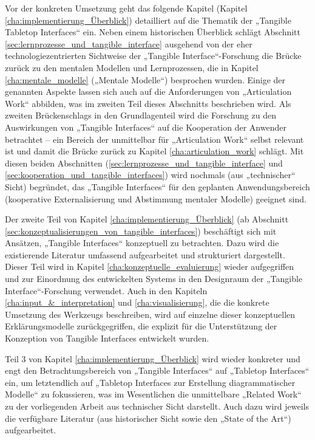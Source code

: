 Vor der konkreten Umsetzung geht das folgende Kapitel (Kapitel \ref{cha:implementierung_Überblick}) detailliert auf die Thematik der „Tangible Tabletop Interfaces“ ein. Neben einem historischen Überblick schlägt Abschnitt \ref{sec:lernprozesse_und_tangible_interface} ausgehend von der eher technologiezentrierten Sichtweise der „Tangible Interface“-Forschung die Brücke zurück zu den mentalen Modellen und Lernprozessen, die in Kapitel \ref{cha:mentale_modelle} („Mentale Modelle“) besprochen wurden. Einige der genannten Aspekte lassen sich auch auf die Anforderungen von „Articulation Work“ abbilden, was im zweiten Teil dieses Abschnitts beschrieben wird. Als zweiten Brückenschlags in den Grundlagenteil wird die Forschung zu den Auswirkungen von „Tangible Interfaces“ auf die Kooperation der Anwender betrachtet -- ein Bereich der unmittelbar für „Articulation Work“ selbst relevant ist und damit die Brücke zurück zu Kapitel \ref{cha:articulation_work} schlägt. Mit diesen beiden Abschnitten (\ref{sec:lernprozesse_und_tangible_interface} und \ref{sec:kooperation_und_tangible_interfaces}) wird nochmals (aus „technischer“ Sicht) begründet, das „Tangible Interfaces“ für den geplanten Anwendungsbereich (kooperative Externalisierung und Abstimmung mentaler Modelle) geeignet sind.

Der zweite Teil von Kapitel \ref{cha:implementierung_Überblick} (ab Abschnitt \ref{sec:konzeptualisierungen_von_tangible_interfaces}) beschäftigt sich mit Ansätzen, „Tangible Interfaces“ konzeptuell zu betrachten. Dazu wird die existierende Literatur umfassend aufgearbeitet und strukturiert dargestellt. Dieser Teil wird in Kapitel \ref{cha:konzeptuelle_evaluierung} wieder aufgegriffen und zur Einordnung des entwickelten Systems in den Designraum der „Tangible Interface“-Forschung verwendet. Auch in den Kapiteln \ref{cha:input_&_interpretation} und \ref{cha:visualisierung}, die die konkrete Umsetzung des Werkzeugs beschreiben, wird auf einzelne dieser konzeptuellen Erklärungsmodelle zurückgegriffen, die explizit für die Unterstützung der Konzeption von Tangible Interfaces entwickelt wurden.

Teil 3 von Kapitel \ref{cha:implementierung_Überblick} wird wieder konkreter und engt den Betrachtungsbereich von „Tangible Interfaces“ auf „Tabletop Interfaces“ ein, um letztendlich auf „Tabletop Interfaces zur Erstellung diagrammatischer Modelle“ zu fokussieren, was im Wesentlichen die unmittelbare „Related Work“ zu der vorliegenden Arbeit aus technischer Sicht darstellt. Auch dazu wird jeweils die verfügbare Literatur (aus historischer Sicht sowie den „State of the Art“) aufgearbeitet.

